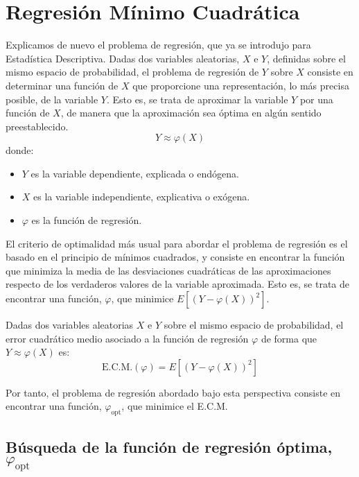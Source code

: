 \section{Regresión Mínimo Cuadrática}

Explicamos de nuevo el problema de regresión, que ya se introdujo para Estadística Descriptiva. Dadas dos variables aleatorias, $X$ e $Y$, definidas sobre el mismo espacio de probabilidad, el problema de regresión de $Y$ sobre $X$ consiste en determinar una función de $X$ que proporcione una representación, lo más precisa posible, de la variable $Y$. Esto es, se trata de aproximar la variable $Y$ por una función de $X$, de manera que la aproximación sea óptima en algún sentido preestablecido.
\begin{equation*}
    Y\approx \varphi(X)
\end{equation*}
donde:
\begin{itemize}
    \item $Y$ es la variable dependiente, explicada o endógena.
    \item $X$ es la variable independiente, explicativa o exógena.
    \item $\varphi$ es la función de regresión.
\end{itemize}

El criterio de optimalidad más usual para abordar el problema de regresión es el basado en el principio de mínimos cuadrados, y consiste en encontrar la función que minimiza la media de las desviaciones cuadráticas de las aproximaciones respecto de los verdaderos valores de la variable aproximada. Esto es, se trata de encontrar una función, $\varphi$, que minimice $E[(Y - \varphi(X))^2]$.

\begin{definicion}
    Dadas dos variables aleatorias $X$ e $Y$ sobre el mismo espacio de probabilidad, el error cuadrático medio asociado a la función de regresión $\varphi$ de forma que $Y\approx \varphi(X)$ es:
    \begin{equation*}
        \text{E.C.M.}(\varphi) = E[(Y - \varphi(X))^2]
    \end{equation*}
\end{definicion}

Por tanto, el problema de regresión abordado bajo esta perspectiva consiste en encontrar una función, $\varphi_{\text{opt}}$, que minimice el E.C.M.

\subsection{Búsqueda de la función de regresión óptima, $\varphi_{\text{opt}}$}

